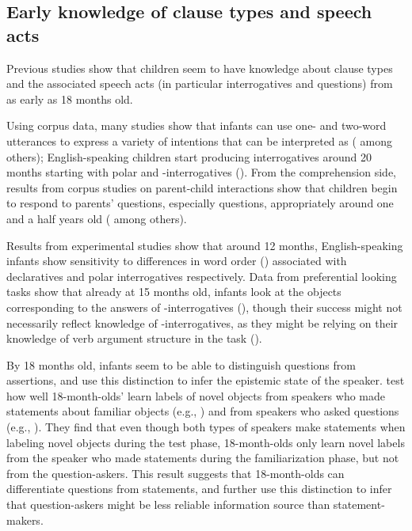\subsection{Early knowledge of clause types and speech acts} \label{sec:bg:acq:spcl}

Previous studies show that children seem to have knowledge about clause types and the associated speech acts (in particular interrogatives and questions) from as early as 18 months old. 

Using corpus data, many studies show that infants can use one- and two-word utterances to express a variety of intentions that can be interpreted as \aqrs{} (\cite{bateson1975,bates1976language,ninio1994} among others); English-speaking children start producing interrogatives around 20 months starting with polar and \twh-interrogatives (\citealt{tyack1977, stromswold1995, rowland2003cdswh}). From the comprehension side, results from corpus studies on parent-child interactions show that children begin to respond to parents’ questions, especially  questions, appropriately around one and a half years old (\citealt{ervintripp1978, steffensen1978, shatz1978comprehension, shatz1978communicative, berningergarvey1981, shatzmccloskey1984, clark2015turn, moradlou2020} among others). 





Results from experimental studies show that around 12 months, English-speaking infants show sensitivity to differences in word order (\citealt{geffenmintz2015wordorder}) associated with declaratives and polar interrogatives respectively. Data from preferential looking tasks show that already at 15 months old, infants look at the objects corresponding to the answers of \twh-interrogatives (\citealt{seidl2003wh, gagliardi2016wh, perkins2020filler}), though their success might not necessarily reflect knowledge of \twh-interrogatives, as they might be relying on their knowledge of verb argument structure in the task (\citealt{perkins2019}). 

By 18 months old, infants seem to be able to distinguish questions from assertions, and use this distinction to infer the epistemic state of the speaker. \textcite{luchkina2018infant} test how well 18-month-olds’ learn labels of novel objects from speakers who made statements about familiar objects (e.g., ) and from speakers who asked questions (e.g., ). They find that even though both types of speakers make statements when labeling novel objects during the test phase, 18-month-olds only learn novel labels from the speaker who made statements during the familiarization phase, but not from the question-askers. This result suggests that 18-month-olds can differentiate questions from statements, and further use this distinction to infer that question-askers might be less reliable information source than statement-makers. 

